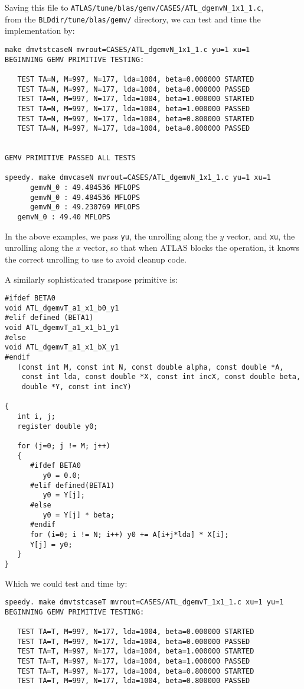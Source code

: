 \documentclass[11pt]{article}
\begin{document}
{Saving this file to 
{\tt ATLAS/tune/blas/gemv/CASES/ATL\_dgemvN\_1x1\_1.c}, \\from the
{\tt BLDdir/tune/blas/gemv/} directory, we can test and time
the implementation by:
\begin{verbatim}
make dmvtstcaseN mvrout=CASES/ATL_dgemvN_1x1_1.c yu=1 xu=1
BEGINNING GEMV PRIMITIVE TESTING:

   TEST TA=N, M=997, N=177, lda=1004, beta=0.000000 STARTED
   TEST TA=N, M=997, N=177, lda=1004, beta=0.000000 PASSED
   TEST TA=N, M=997, N=177, lda=1004, beta=1.000000 STARTED
   TEST TA=N, M=997, N=177, lda=1004, beta=1.000000 PASSED
   TEST TA=N, M=997, N=177, lda=1004, beta=0.800000 STARTED
   TEST TA=N, M=997, N=177, lda=1004, beta=0.800000 PASSED


GEMV PRIMITIVE PASSED ALL TESTS

speedy. make dmvcaseN mvrout=CASES/ATL_dgemvN_1x1_1.c yu=1 xu=1
      gemvN_0 : 49.484536 MFLOPS
      gemvN_0 : 49.484536 MFLOPS
      gemvN_0 : 49.230769 MFLOPS
   gemvN_0 : 49.40 MFLOPS
\end{verbatim}

In the above examples, we pass {\tt yu}, the unrolling along the $y$ vector,
and {\tt xu}, the unrolling along the $x$ vector, so that when ATLAS
blocks the operation, it knows the correct unrolling to use to avoid
cleanup code.

A similarly sophisticated transpose primitive is:
\begin{verbatim}
#ifdef BETA0
void ATL_dgemvT_a1_x1_b0_y1
#elif defined (BETA1)
void ATL_dgemvT_a1_x1_b1_y1
#else
void ATL_dgemvT_a1_x1_bX_y1
#endif
   (const int M, const int N, const double alpha, const double *A,
    const int lda, const double *X, const int incX, const double beta,
    double *Y, const int incY)

{
   int i, j;
   register double y0;

   for (j=0; j != M; j++)
   {
      #ifdef BETA0
         y0 = 0.0;
      #elif defined(BETA1)
         y0 = Y[j];
      #else
         y0 = Y[j] * beta;
      #endif
      for (i=0; i != N; i++) y0 += A[i+j*lda] * X[i];
      Y[j] = y0;
   }
}
\end{verbatim}

Which we could test and time by:
\begin{verbatim}
speedy. make dmvtstcaseT mvrout=CASES/ATL_dgemvT_1x1_1.c xu=1 yu=1
BEGINNING GEMV PRIMITIVE TESTING:

   TEST TA=T, M=997, N=177, lda=1004, beta=0.000000 STARTED
   TEST TA=T, M=997, N=177, lda=1004, beta=0.000000 PASSED
   TEST TA=T, M=997, N=177, lda=1004, beta=1.000000 STARTED
   TEST TA=T, M=997, N=177, lda=1004, beta=1.000000 PASSED
   TEST TA=T, M=997, N=177, lda=1004, beta=0.800000 STARTED
   TEST TA=T, M=997, N=177, lda=1004, beta=0.800000 PASSED



\end{verbatim}}
\end{document}
